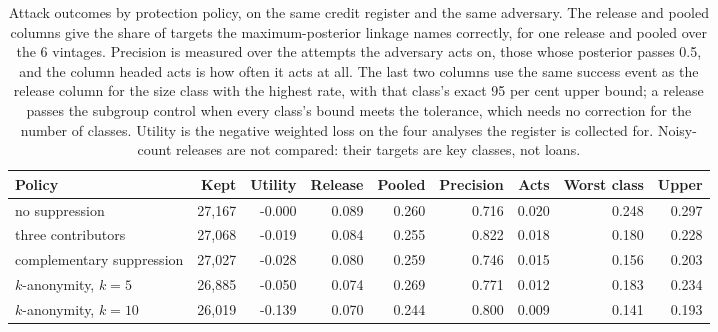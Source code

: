 \begin{table}[t]
\centering
\caption{Attack outcomes by protection policy, on the same credit register and the same adversary. The release and pooled columns give the share of targets the maximum-posterior linkage names correctly, for one release and pooled over the 6 vintages. Precision is measured over the attempts the adversary acts on, those whose posterior passes 0.5, and the column headed acts is how often it acts at all. The last two columns use the same success event as the release column for the size class with the highest rate, with that class's exact 95 per cent upper bound; a release passes the subgroup control when every class's bound meets the tolerance, which needs no correction for the number of classes. Utility is the negative weighted loss on the four analyses the register is collected for. Noisy-count releases are not compared: their targets are key classes, not loans.}
\label{tab:eval}
\small
\begin{tabular}{lrrrrrrrr}
\toprule
Policy & Kept & Utility & Release & Pooled & Precision & Acts & Worst class & Upper \\
\midrule
no suppression & 27{,}167 & -0.000 & 0.089 & 0.260 & 0.716 & 0.020 & 0.248 & 0.297 \\
three contributors & 27{,}068 & -0.019 & 0.084 & 0.255 & 0.822 & 0.018 & 0.180 & 0.228 \\
complementary suppression & 27{,}027 & -0.028 & 0.080 & 0.259 & 0.746 & 0.015 & 0.156 & 0.203 \\
$k$-anonymity, $k=5$ & 26{,}885 & -0.050 & 0.074 & 0.269 & 0.771 & 0.012 & 0.183 & 0.234 \\
$k$-anonymity, $k=10$ & 26{,}019 & -0.139 & 0.070 & 0.244 & 0.800 & 0.009 & 0.141 & 0.193 \\
\bottomrule
\end{tabular}
\end{table}
